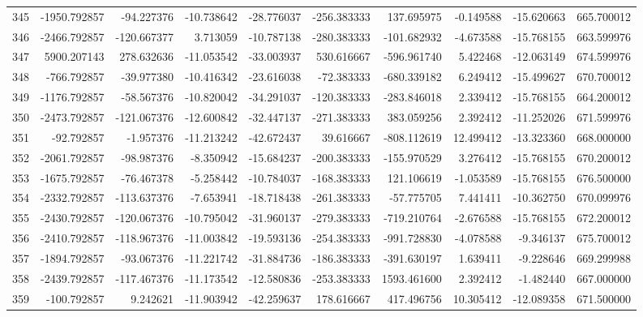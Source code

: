 \begin{tabular}{lrrrrrrrrr}
345 &  -1950.792857 &   -94.227376 & -10.738642 & -28.776037 &  -256.383333 &   137.695975 &  -0.149588 & -15.620663 &  665.700012 \\
346 &  -2466.792857 &  -120.667377 &   3.713059 & -10.787138 &  -280.383333 &  -101.682932 &  -4.673588 & -15.768155 &  663.599976 \\
347 &   5900.207143 &   278.632636 & -11.053542 & -33.003937 &   530.616667 &  -596.961740 &   5.422468 & -12.063149 &  674.599976 \\
348 &   -766.792857 &   -39.977380 & -10.416342 & -23.616038 &   -72.383333 &  -680.339182 &   6.249412 & -15.499627 &  670.700012 \\
349 &  -1176.792857 &   -58.567376 & -10.820042 & -34.291037 &  -120.383333 &  -283.846018 &   2.339412 & -15.768155 &  664.200012 \\
350 &  -2473.792857 &  -121.067376 & -12.600842 & -32.447137 &  -271.383333 &   383.059256 &   2.392412 & -11.252026 &  671.599976 \\
351 &    -92.792857 &    -1.957376 & -11.213242 & -42.672437 &    39.616667 &  -808.112619 &  12.499412 & -13.323360 &  668.000000 \\
352 &  -2061.792857 &   -98.987376 &  -8.350942 & -15.684237 &  -200.383333 &  -155.970529 &   3.276412 & -15.768155 &  670.200012 \\
353 &  -1675.792857 &   -76.467378 &  -5.258442 & -10.784037 &  -168.383333 &   121.106619 &  -1.053589 & -15.768155 &  676.500000 \\
354 &  -2332.792857 &  -113.637376 &  -7.653941 & -18.718438 &  -261.383333 &   -57.775705 &   7.441411 & -10.362750 &  670.099976 \\
355 &  -2430.792857 &  -120.067376 & -10.795042 & -31.960137 &  -279.383333 &  -719.210764 &  -2.676588 & -15.768155 &  672.200012 \\
356 &  -2410.792857 &  -118.967376 & -11.003842 & -19.593136 &  -254.383333 &  -991.728830 &  -4.078588 &  -9.346137 &  675.700012 \\
357 &  -1894.792857 &   -93.067376 & -11.221742 & -31.884736 &  -186.383333 &  -391.630197 &   1.639411 &  -9.228646 &  669.299988 \\
358 &  -2439.792857 &  -117.467376 & -11.173542 & -12.580836 &  -253.383333 &  1593.461600 &   2.392412 &  -1.482440 &  667.000000 \\
359 &   -100.792857 &     9.242621 & -11.903942 & -42.259637 &   178.616667 &   417.496756 &  10.305412 & -12.089358 &  671.500000 \\

\end{tabular}
